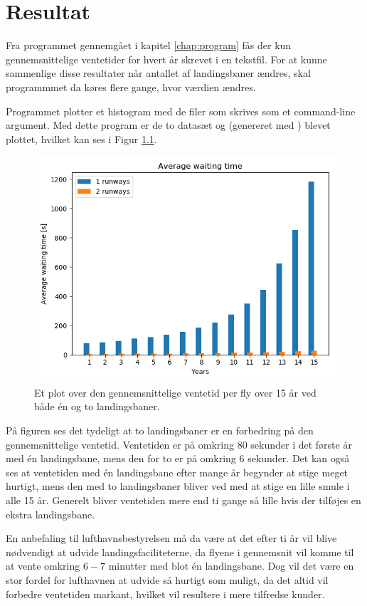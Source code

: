\chapter{Resultat}
Fra programmet gennemgået i kapitel \ref{chap:program} fås der kun gennemsnittelige ventetider for hvert år skrevet i en tekstfil.
For at kunne sammenlige disse resultater når antallet af landingsbaner ændres, skal programmmet da køres flere gange, hvor værdien  ændres.

Programmet  plotter et histogram med de filer som skrives som et command-line argument.
Med dette program er de to datasæt  og  (genereret med ) blevet plottet, hvilket kan ses i Figur \ref{fig:results}.

\begin{figure}[h]
	\centering
	\includegraphics[scale=0.7]{fig/img/results_15Y.png}
	\caption{Et plot over den gennemsnittelige ventetid per fly over 15 år ved både én og to landingsbaner.} \label{fig:results}
\end{figure}

På figuren ses det tydeligt at to landingsbaner er en forbedring på den gennemsnittelige ventetid.
Ventetiden er på omkring 80 sekunder i det første år med én landingsbane, mens den for to er på omkring 6 sekunder.
Det kan også ses at ventetiden med én landingsbane efter mange år begynder at stige meget hurtigt, mens den med to landingsbaner bliver ved med at stige en lille smule i alle 15 år.
Generelt bliver ventetiden mere end ti gange så lille hvis der tilføjes en ekstra landingsbane.

En anbefaling til lufthavnsbestyrelsen må da være at det efter ti år vil blive nødvendigt at udvide landingsfaciliteterne, da flyene i gennemsnit vil komme til at vente omkring $6-7$ minutter med blot én landingsbane.
Dog vil det være en stor fordel for lufthavnen at udvide så hurtigt som muligt, da det altid vil forbedre ventetiden markant, hvilket vil resultere i mere tilfredse kunder.
